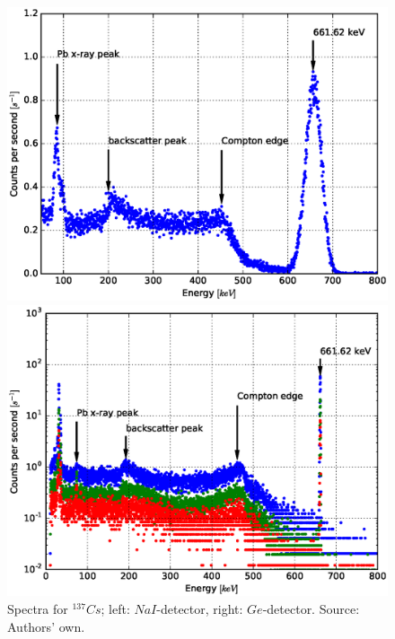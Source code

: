 \documentclass[a4paper]{article}
\begin{document}
\begin{figure}[H]
	\begin{minipage}[t]{0.5\textwidth}
		\begin{center}
		\includegraphics[width=1.0\textwidth]{plots/cs137.eps}
		\end{center}
	\end{minipage}
	\begin{minipage}[t]{0.5\textwidth}
		\begin{center}
		\includegraphics[width=1.0\textwidth]{plots/cs137_ged.eps}
		\end{center}
	\end{minipage}
	\caption{Spectra for $^{137}Cs$; left: $NaI$-detector, right: $Ge$-detector. Source: Authors' own.}
	\label{fig:cs137}
\end{figure}
\end{document}
